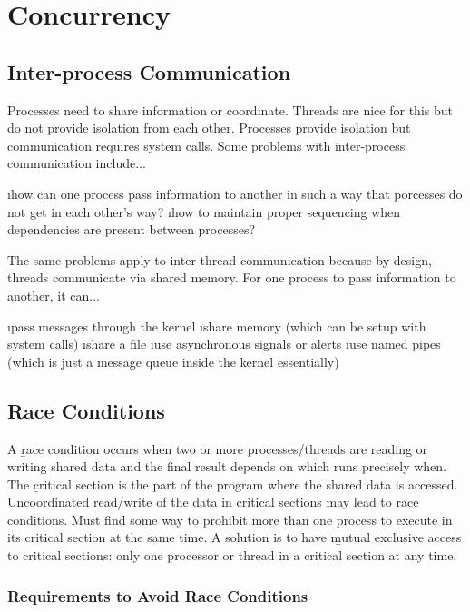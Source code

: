 \documentclass{article}
\begin{document}
\section{Concurrency}

\subsection{Inter-process Communication}

    Processes need to share information or coordinate. Threads are nice for this but do not provide isolation from each other. Processes provide isolation but communication requires system calls. Some \b{problems with inter-process communication} include...

    \bl 
    \i how can one process pass information to another in such a way that porcesses do not get in each other's way?
    \i how to maintain proper sequencing when dependencies are present between processes?
    \el 

    \noindent The same problems apply to inter-thread communication because by design, threads communicate via shared memory. For one process to \b{pass information} to another, it can...

    \bl 
    \i pass messages through the kernel
    \i share memory (which can be setup with system calls)
    \i share a file 
    \i use asynchronous signals or alerts
    \i use named pipes (which is just a message queue inside the kernel essentially)
    \el 
    
\subsection{Race Conditions}

    A \b{race condition} occurs when two or more processes/threads are reading or writing shared data and the final result depends on which runs precisely when. The \b{critical section} is the part of the program where the shared data is accessed. Uncoordinated read/write of the data in critical sections may lead to race conditions. Must find some way to prohibit more than one process to execute in its critical section at the same time. A solution is to have \b{mutual exclusive} access to critical sections: only one processor or thread in a critical section at any time. 

    \subsubsection{Requirements to Avoid Race Conditions}
\end{document}

